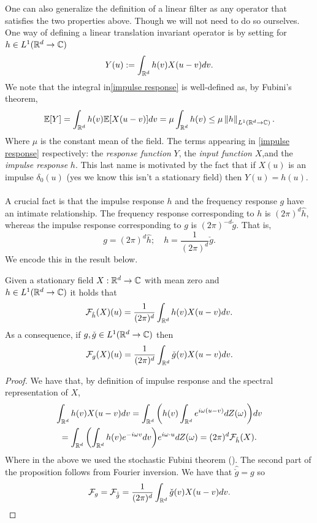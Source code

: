 \documentclass[
    a4paper,
    DIV=14,
    abstract=true,
    numbers=noenddot
]{scrartcl}
\begin{document}
One can also generalize the definition of a linear filter as any operator that satisfies the two properties above. Though we will not need to do so ourselves. One way of defining a linear translation invariant operator is by setting for $h\in L^1(\mathbb{R}^d\to\mathbb{C})$
\begin{equation}\label{impulse response}
	Y(u):=\int_{\mathbb{R}^d} h(v)X(u-v) dv.
\end{equation}
We note that the integral in\eqref{impulse response} is well-defined as, by Fubini's theorem,
\begin{equation*}
	\mathbb{E}[Y]=\int_{\mathbb{R}^d} h(v)\mathbb{E}[X(u-v)] dv=\mu\int_{\mathbb{R}^d} h(v)\leq \mu\left\lVert h \right\rVert_{L^1(\mathbb{R}^d\to\mathbb{C})}.
\end{equation*}
Where $\mu$ is the constant mean of the field.
The terms appearing in \eqref{impulse response} respectively: the \emph{response function} $Y$,  the \emph{input function} $X$,and  the \emph{impulse response} $h$. This last name is motivated by the fact that if $X(u)$ is an impulse $\delta _0(u)$ (yes we know this isn't a stationary field) then $Y(u)=h(u)$.\\
\\
A crucial fact is that the impulse response $h$ and the frequency response $g$ have an intimate relationship. The frequency response corresponding to  $h$ is $(2\pi)^d\hat{h}$, whereas the impulse response corresponding to $g$ is $(2\pi)^{-d}\check{g}$. That is,
\begin{equation*}
	g=(2\pi)^d\hat{h};\quad h=\frac{1}{(2\pi)^d}\check{g}.
\end{equation*}
We encode this in the result below.
\begin{proposition}
	Given a  stationary field $X:\mathbb{R}^d\to\mathbb{C}$ with mean zero and\\ $h\in L^1(\mathbb{R}^d\to\mathbb{C})$  it holds that
	\begin{equation*}
		\mathcal{F}_{\hat{h}}(X)(u)=\frac{1}{(2\pi)^d}\int_{\mathbb{R}^d} h(v)X(u-v) dv.
	\end{equation*}
	As a consequence, if  $g,\check{g}\in L^1(\mathbb{R}^d\to\mathbb{C})$ then
	\begin{equation*}
		\mathcal{F}_g(X)(u)=\frac{1}{(2\pi)^d}\int_{\mathbb{R}^d} \check{g}(v)X(u-v) dv.
	\end{equation*}
\end{proposition}
\begin{proof}
	We have that, by definition of impulse response and the spectral representation of $X$,
	\begin{multline*}
		\int_{\mathbb{R}^d} h(v)X(u-v) dv= \int_{\mathbb{R}^d} \qty(h(v)\int_{\mathbb{R}^d} e^{i\omega (u-v)}dZ(\omega)) dv\\=\int_{\mathbb{R}^d}\qty(\int_{\mathbb{R}^d} h(v)e^{-i\omega v}dv) e^{i\omega\cdot u}dZ(\omega)=(2\pi)^d\mathcal{F}_{\hat{h}}(X).
	\end{multline*}
	Where in the above we used the stochastic Fubini theorem (). The second part of the proposition follows from Fourier inversion. We have that $\hat{\check{g}}=g$ so
	\begin{equation*}
		\mathcal{F}_g=\mathcal{F}_{\hat{\check{g}}}=\frac{1}{(2\pi)^d}\int_{\mathbb{R}^d} \check{g}(v)X(u-v) dv.
	\end{equation*}
\end{proof}
\end{document}
